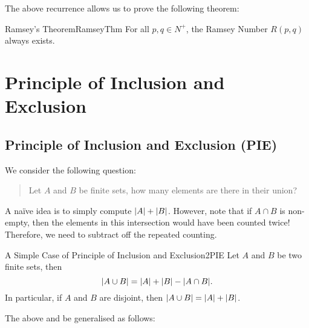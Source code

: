 \documentclass[math]{amznotes}
\theoremstyle{remark}
\begin{document}
The above recurrence allows us to prove the following theorem:
\begin{thmbox}{Ramsey's Theorem}{RamseyThm}
    For all $p, q \in N^+$, the Ramsey Number $R(p, q)$ always exists.
\end{thmbox}

\chapter{Principle of Inclusion and Exclusion}
\section{Principle of Inclusion and Exclusion (PIE)}
We consider the following question:
\begin{quote}
    Let $A$ and $B$ be finite sets, how many elements are there in their union?
\end{quote}
A naïve idea is to simply compute ${\left\lvert {A} \right\rvert} + {\left\lvert {B} \right\rvert}$. However, note that if $A \cap B$ is non-empty, then the elements in this intersection would have been counted twice! Therefore, we need to subtract off the repeated counting.
\begin{probox}{A Simple Case of Principle of Inclusion and Exclusion}{2PIE}
    Let $A$ and $B$ be two finite sets, then
    \begin{equation*}
        {\left\lvert {A \cup B} \right\rvert} = {\left\lvert {A} \right\rvert} + {\left\lvert {B} \right\rvert} - {\left\lvert {A \cap B} \right\rvert}.
    \end{equation*}
    In particular, if $A$ and $B$ are disjoint, then ${\left\lvert {A \cup B} \right\rvert} = {\left\lvert {A} \right\rvert} + {\left\lvert {B} \right\rvert}$.
\end{probox}
The above and be generalised as follows:
\end{document}
